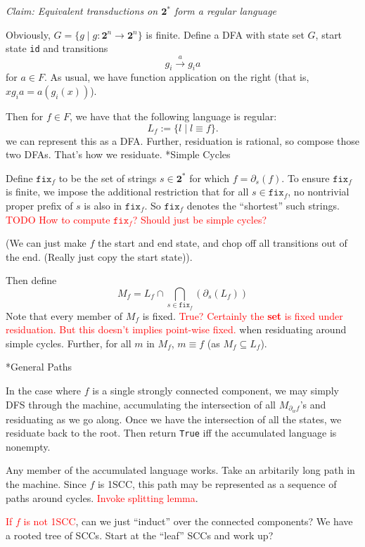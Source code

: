 \documentclass{amsart}
\makeatletter
\newcommand\myworries[1]{\textcolor{red}{#1}}
\renewcommand\subsection{\@startsection{subsection}{2}%
  \z@{-.5\linespacing\@plus-.7\linespacing}{.5\linespacing}%
  {\normalfont\scshape}}
\newcommand{\0}{\underline{0}}
\newcommand{\1}{\underline{1}}
\newcommand{\2}{\underline{2}}
\makeatother
\begin{document}
\emph{Claim: Equivalent transductions on $\textbf{2}^*$ form a regular language}

Obviously, $G = \{ g \mid g : \textbf{2}^n \rightarrow \textbf{2}^n \}$ is finite. Define a DFA with state set $G$, start state \texttt{id} and transitions
\[
g_i \stackrel{a}{\longrightarrow} g_i a
\]
for $a \in F$. As usual, we have function application on the right (that is, $x g_i a = a(g_i(x))$).

Then for $f \in F$, we have that the following language is regular:
\[
L_{f} := \{l \mid l \equiv f \}.
\]
we can represent this as a DFA. Further, residuation is rational, so compose those two DFAs. That's how we residuate.
\subsection*{Simple Cycles}

Define $\texttt{fix}_{f}$ to be the set of strings $s\in \textbf{2}^*$ for which $f = \partial_s (f)$. To ensure $\texttt{fix}_{f}$ is finite, we impose the additional restriction that for all $s \in \texttt{fix}_{f}$, no nontrivial proper prefix of $s$ is also in $\texttt{fix}_{f}$. So $\texttt{fix}_{f}$ denotes the ``shortest'' such strings. \myworries{TODO How to compute $\texttt{fix}_f$? Should just be simple cycles?}

(We can just make $f$ the start and end state, and chop off all transitions out of the end. (Really just copy the start state)).

Then define
\[
  M_{f} = L_{f}\cap \bigcap_{s \in \texttt{fix}_{f}} (\partial_s (L_{f}))
\]
Note that every member of $M_{f}$ is fixed. \myworries{True? Certainly the \textbf{set} is fixed under residuation. But this doesn't implies point-wise fixed.
} 
when residuating around simple cycles. Further, for all $m$ in $M_{f}$, $m \equiv f$ (as $M_{f} \subseteq L_{f}$).

\subsection*{General Paths}

In the case where $f$ is a single strongly connected component, we may simply DFS through the machine, accumulating the intersection of all $M_{\partial_w f}$'s and residuating as we go along. Once we have the intersection of all the states, we residuate back to the root. Then return \texttt{True} iff the accumulated language is nonempty.

Any member of the accumulated language works. Take an arbitarily long path in the machine. Since $f$ is 1SCC, this path may be represented as a sequence of paths around cycles. \myworries{Invoke splitting lemma}.

\myworries{If $f$ is not 1SCC}, can we just ``induct'' over the connected components? We have a rooted tree of SCCs. Start at the ``leaf'' SCCs and work up?

\end{document}
